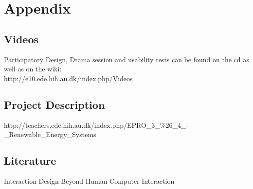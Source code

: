 \chapter{Appendix}
\section{Videos}
Participatory Design, Drama session and usability tests can be found on the cd as well as on the wiki:
\\ http://e10.ede.hih.au.dk/index.php/Videos

\section{Project Description}
http://teachers.ede.hih.au.dk/index.php/EPRO\_3\_\%26\_4\_-\_Renewable\_Energy\_Systems

\section{Literature}
Interaction Design Beyond Human Computer Interaction